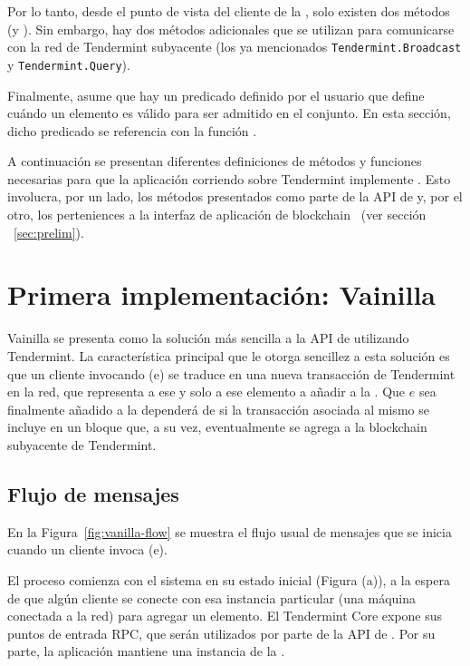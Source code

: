 Por lo tanto, desde el punto de vista del cliente de la \setchain, solo existen dos
métodos (\Add y \Get).
%
Sin embargo, hay dos métodos adicionales que se utilizan para comunicarse con la
red de Tendermint subyacente (los ya mencionados \texttt{Tendermint.Broadcast} y
\texttt{Tendermint.Query}).
%

Finalmente, \setchain asume que hay un predicado definido por el usuario que define
cuándo un elemento es válido para ser admitido en el conjunto.
%
En esta sección, dicho predicado se referencia con la función \isValidElement.

%
A continuación se presentan diferentes definiciones de métodos y funciones
necesarias para que la aplicación corriendo sobre Tendermint implemente \setchain.
Esto involucra, por un lado, los métodos presentados como parte de la API de
\setchain y, por el otro, los perteniences a la interfaz de aplicación de
blockchain ~(ver sección ~\ref{sec:prelim}).

\section{Primera implementación: Vainilla}\label{sec:vanilla}

Vainilla se presenta como la solución más sencilla a la API de \setchain
utilizando Tendermint.
%
La característica principal que le otorga sencillez a esta solución es que
un cliente invocando \Add(e) se traduce en una nueva transacción de Tendermint en la red,
que representa a ese y solo a ese elemento a añadir a la \setchain.
%
Que $e$ sea finalmente añadido a la \setchain dependerá de si la transacción asociada
al mismo se incluye en un bloque que, a su vez, eventualmente se agrega a la blockchain
subyacente de Tendermint. 

\subsection{Flujo de mensajes}
En la Figura~\ref{fig:vanilla-flow} se muestra el flujo usual de mensajes que se inicia
cuando un cliente invoca \Add(e).
%

El proceso comienza con el sistema en su estado inicial (Figura (a)), a la espera de que algún cliente
se conecte con esa instancia particular (una máquina conectada a la red) para agregar un elemento.
El Tendermint Core expone sus puntos de entrada RPC, que serán utilizados por parte de la API de
\setchain. Por su parte, la aplicación mantiene una instancia de la \setchain.
%

